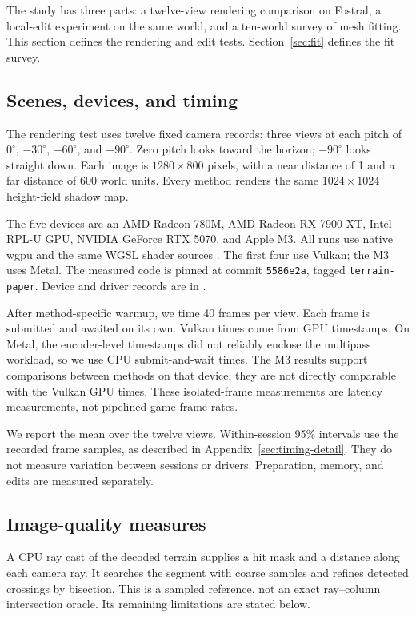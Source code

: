 \documentclass{jcgt}
\newcommand{\code}[1]{\texttt{#1}}
\begin{document}
The study has three parts: a twelve-view rendering comparison on Fostral, a local-edit experiment on the same world, and a ten-world survey of mesh fitting. This section defines the rendering and edit tests. Section~\ref{sec:fit} defines the fit survey.

\subsection{Scenes, devices, and timing}\label{sec:protocol}

The rendering test uses twelve fixed camera records: three views at each pitch of $0^\circ$, $-30^\circ$, $-60^\circ$, and $-90^\circ$. Zero pitch looks toward the horizon; $-90^\circ$ looks straight down. Each image is $1280\times800$ pixels, with a near distance of 1 and a far distance of 600 world units. Every method renders the same $1024\times1024$ height-field shadow map.

The five devices are an AMD Radeon 780M, AMD Radeon RX 7900 XT, Intel RPL-U GPU, NVIDIA GeForce RTX 5070, and Apple M3. All runs use native wgpu and the same WGSL shader sources \citep{wgpu,w3cwebgpu,w3cwgsl}. The first four use Vulkan; the M3 uses Metal. The measured code is pinned at commit \code{5586e2a}, tagged \code{terrain-paper}. Device and driver records are in .

After method-specific warmup, we time 40 frames per view. Each frame is submitted and awaited on its own. Vulkan times come from GPU timestamps. On Metal, the encoder-level timestamps did not reliably enclose the multipass workload, so we use CPU submit-and-wait times. The M3 results support comparisons between methods on that device; they are not directly comparable with the Vulkan GPU times. These isolated-frame measurements are latency measurements, not pipelined game frame rates.

We report the mean over the twelve views. Within-session 95\% intervals use the recorded frame samples, as described in Appendix~\ref{sec:timing-detail}. They do not measure variation between sessions or drivers. Preparation, memory, and edits are measured separately.

\subsection{Image-quality measures}\label{sec:metrics}

A CPU ray cast of the decoded terrain supplies a hit mask and a distance along each camera ray. It searches the segment with coarse samples and refines detected crossings by bisection. This is a sampled reference, not an exact ray--column intersection oracle. Its remaining limitations are stated below.
\end{document}

